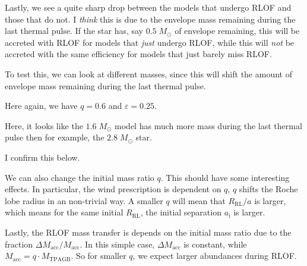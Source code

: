 \documentclass[a4paper,10pt]{article}
\begin{document}
Lastly, we see a quite sharp drop between the models that undergo RLOF and those that do not.
I \emph{think} this is due to the envelope mass remaining during the last thermal pulse.
If the star has, say \(0.5\; M_\odot \) of envelope remaining, this will be accreted with RLOF
for models that \emph{just} undergo RLOF, while this will \emph{not} be accreted with the same
efficiency for models that just barely miss RLOF.

To test this, we can look at different masses, since this will shift the amount of
envelope mass remaining during the last thermal pulse.

Here again, we have \(q=0.6\) and \(\varepsilon =0.25\).
\begin{figure}[ht]
	\centering
\end{figure}

Here, it looks like the \(1.6\; M_\odot \) model has much more mass during the last thermal pulse
then for example, the \(2.8\; M_\odot \) star.

I confirm this below.
\begin{figure}[ht]
	\centering
\end{figure}

We can also change the initial mass ratio \(q\).
This should have some interesting effects.
In particular, the \citet{saladino2018, saladino2019} wind prescription is dependent on \(q\), \(q\) shifts
the Roche lobe radius in an non-trivial way.
A smaller \(q\) will mean that \(R_\text{RL}/a\) is
larger, which means for the same initial \(R_\text{RL}\), the initial separation \(a_\text{i}\)
is larger.

Lastly, the RLOF mass transfer is depends on the initial mass ratio due to the fraction
\(\Delta M_\text{acc} / M_\text{acc}\).
In this simple case, \(\Delta M_\text{acc}\) is constant,
while \(M_\text{acc} = q \cdot M_\text{TPAGB}\).
So for smaller \(q\), we expect larger abundances
during RLOF.
\end{document}
